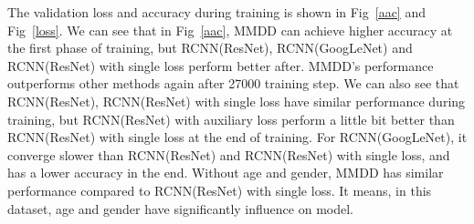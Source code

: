 \documentclass[runningheads]{llncs}
\begin{document}
\begin{table}[htb]
    \vspace{-0cm}
    \caption{Comparison of All Kinds of RCNN and MMDD}
    \vspace{-0cm}
    \begin{center}
    \vspace{-0cm}
    \label{comparison}
    \end{center}
    \vspace{-0cm}
    \end{table}

The validation loss and accuracy during training is shown in Fig~\ref{aac} and Fig~\ref{loss}. We can see that in Fig~\ref{aac}, MMDD can achieve higher accuracy at the first phase of training, but RCNN(ResNet), RCNN(GoogLeNet) and RCNN(ResNet) with single loss perform better after. MMDD's performance outperforms other methods again after 27000 training step. We can also see that RCNN(ResNet), RCNN(ResNet) with single loss have similar performance during training, but RCNN(ResNet) with auxiliary loss perform a little bit better than RCNN(ResNet) with single loss at the end of training. For RCNN(GoogLeNet), it converge slower than RCNN(ResNet) and RCNN(ResNet) with single loss, and has a lower accuracy in the end. Without age and gender, MMDD has similar performance compared to RCNN(ResNet) with single loss. It means, in this dataset, age and gender have significantly influence on model.
\end{document}
